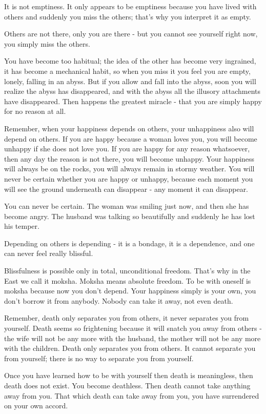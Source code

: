 It is not emptiness. It only appears to be emptiness because you have lived with others and suddenly you miss the others; that's why you interpret it as empty.

Others are not there, only you are there - but you cannot see yourself right now, you simply miss the others.

You have become too habitual; the idea of the other has become very ingrained, it has become a mechanical habit, so when you miss it you feel you are empty, lonely, falling in an abyss. But if you allow and fall into the abyss, soon you will realize the abyss has disappeared, and with the abyss all the illusory attachments have disappeared. Then happens the greatest miracle - that you are simply happy for no reason at all.

Remember, when your happiness depends on others, your unhappiness also will depend on others. If you are happy because a woman loves you, you will become unhappy if she does not love you. If you are happy for any reason whatsoever, then any day the reason is not there, you will become unhappy. Your happiness will always be on the rocks, you will always remain in stormy weather. You will never be certain whether you are happy or unhappy, because each moment you will see the ground underneath can disappear - any moment it can disappear.

You can never be certain. The woman was smiling just now, and then she has become angry. The husband was talking so beautifully and suddenly he has lost his temper.

Depending on others is depending - it is a bondage, it is a dependence, and one can never feel really blissful.

Blissfulness is possible only in total, unconditional freedom. That's why in the East we call it moksha. Moksha means absolute freedom. To be with oneself is moksha because now you don't depend. Your happiness simply is your own, you don't borrow it from anybody. Nobody can take it away, not even death.

Remember, death only separates you from others, it never separates you from yourself. Death seems so frightening because it will snatch you away from others - the wife will not be any more with the husband, the mother will not be any more with the children. Death only separates you from others. It cannot separate you from yourself; there is no way to separate you from yourself.

Once you have learned how to be with yourself then death is meaningless, then death does not exist. You become deathless. Then death cannot take anything away from you. That which death can take away from you, you have surrendered on your own accord.

